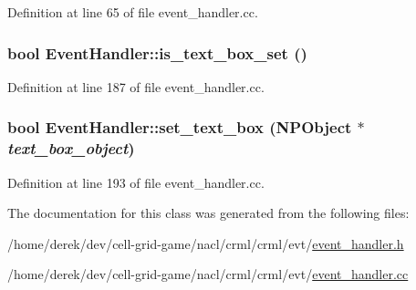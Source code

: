 Definition at line 65 of file event\_\-handler.cc.

\hypertarget{class_event_handler_a2f334e3eb39be72751e342619489e695}{
\subsubsection[{is\_\-text\_\-box\_\-set}]{\setlength{\rightskip}{0pt plus 5cm}bool EventHandler::is\_\-text\_\-box\_\-set ()}}
\label{class_event_handler_a2f334e3eb39be72751e342619489e695}


Definition at line 187 of file event\_\-handler.cc.

\hypertarget{class_event_handler_aa09c0b995aa6c774d4a33be13be0cbf2}{
\subsubsection[{set\_\-text\_\-box}]{\setlength{\rightskip}{0pt plus 5cm}bool EventHandler::set\_\-text\_\-box ({\bf NPObject} $\ast$ {\em text\_\-box\_\-object})}}
\label{class_event_handler_aa09c0b995aa6c774d4a33be13be0cbf2}


Definition at line 193 of file event\_\-handler.cc.



The documentation for this class was generated from the following files:\begin{DoxyCompactItemize}
\item 
/home/derek/dev/cell-\/grid-\/game/nacl/crml/crml/evt/\hyperlink{event__handler_8h}{event\_\-handler.h}\item 
/home/derek/dev/cell-\/grid-\/game/nacl/crml/crml/evt/\hyperlink{event__handler_8cc}{event\_\-handler.cc}\end{DoxyCompactItemize}
